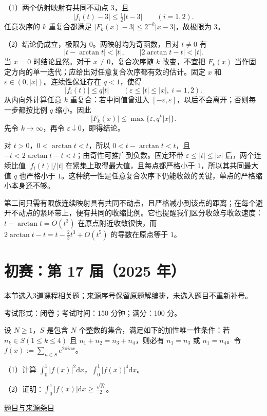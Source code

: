 \documentclass[12pt,fontset=fandol]{ctexart}
\begin{document}
\begin{solve}\label{ans:ch02-16th-A:6}

（1）两个仿射映射有共同不动点 $3$，且
\[
|f_i(t)-3|\leq\tfrac12|t-3|\qquad(i=1,2).
\]
任意次序的 $k$ 重复合都满足 $|F_k(x)-3|\leq2^{-k}|x-3|$，故极限为 $3$。

（2）结论仍成立，极限为 $0$。两映射均为奇函数，且对 $t\neq0$ 有
\[
|t-\arctan t|<|t|,\qquad |2\arctan t-t|<|t|.
\]
当 $x=0$ 时结论显然。对于 $x\neq0$，复合次序随 $k$ 改变，不宜把 $F_k(x)$ 当作固定方向的单一迭代；应给出对任意复合次序都有效的估计。固定 $x$ 和 $\varepsilon\in(0,|x|)$。连续性保证存在 $q<1$，使得
\[
|f_i(t)|\leq q|t|\qquad
(\varepsilon\leq|t|\leq|x|,\ i=1,2).
\]
从内向外计算任意 $k$ 重复合：若中间值曾进入 $[-\varepsilon,\varepsilon]$，以后不会离开；否则每一步都按比例 $q$ 缩小。因此
\[
|F_k(x)|\leq\max\{\varepsilon,q^k|x|\}.
\]
先令 $k\to\infty$，再令 $\varepsilon\downarrow0$，即得结论。

对 $t>0$，$0<\arctan t<t$，所以 $0<t-\arctan t<t$，且 $-t<2\arctan t-t<t$；由奇性可推广到负数。固定环带 $\varepsilon\le|t|\le|x|$ 后，两个连续比值 $|f_i(t)|/|t|$ 在紧集上取得最大值，且每点都严格小于 $1$，所以其共同最大值 $q$ 也严格小于 $1$。这种统一性是任意复合次序下仍能收敛的关键，单点的严格缩小本身还不够。

\end{solve}

\begin{remark}[方法与条件]第二问只需有限族连续映射具有共同不动点，且严格减小到该点的距离；在每个避开不动点的紧环带上，便有共同的收缩比例。它也提醒我们区分收敛与收敛速度：$t-\arctan t=O(t^3)$ 在原点附近收敛很快，而 $2\arctan t-t=t-\tfrac23t^3+O(t^5)$ 的导数在原点等于 $1$。\end{remark}

\section{初赛：第 17 届（2025 年）}

本节选入3道课程相关题；来源序号保留原题解编排，未选入题目不重新补号。

\begin{remark}[来源说明]考试形式：闭卷；考试时间：150 分钟；满分：100 分。\end{remark}

\begin{example}[来源序号2]\label{ex:ch01-17th-A:2}\label{pr:ch01-17th-A:2}

设 $N \geq 1$，$S$ 是包含 $N$ 个整数的集合，满足如下的加性唯一性条件：若 $n_k \in S (1 \leq k \leq 4)$ 且 $n_1 + n_2 = n_3 + n_4$，则必有 $n_1 = n_3$ 或 $n_1 = n_4$。令 $f(x) := \sum_{n \in S} e^{2\pi i nx}$。

（1）计算 $\int_0^1 |f(x)|^2 \mathrm{d}x$，$\int_0^1 |f(x)|^4 \mathrm{d}x$。

（2）证明：$\int_0^1 |f(x)| \mathrm{d}x \geq \frac{\sqrt{N}}{2}$。

\par\href{https://github.com/lzxcr/cmc-mathematics/blob/64916fa1fdbc3e444a652eca204d5669058ee321/src/problems/preliminary/17/02.md}{题目与来源条目}

\end{example}
\end{document}
